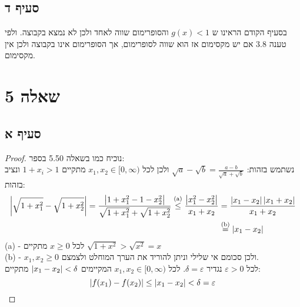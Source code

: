 \documentclass{article}
\begin{document}
	\subsection*{סעיף ד}
	בסעיף הקודם הראינו ש $g(x) < 1$ והסופרימום שווה לאחד ולכן לא נמצא בקבוצה. ולפי טענה 3.8 אם יש מקסימום אז הוא שווה לסופרימום, אך הסופרימום אינו בקבוצה ולכן אין מקסימום.


	\section*{שאלה 5}
	\subsection*{סעיף א}
	\begin{proof}
		נוכיח כמו בשאלה 5.50 בספר: \\
		נשתמש בזהות: $\sqrt{a} - \sqrt{b} = \frac{a-b}{\sqrt{a} + \sqrt{b}}$
		ולכן לכל $x_1, x_2 \in [0, \infty)$ מתקיים $1 + x_i > 1$ ונציב בזהות:
		\begin{align*}
			\left| \sqrt{1+x_1^2} - \sqrt{1 + x_2^2} \right| =
			\frac{\left| 1 + x_1^2 - 1 - x_2^2 \right|}{\sqrt{1 + x_1^2} + \sqrt{1 + x_2^2}} \overset{\text{(a)}}\leq
			\frac{\left| x_1^2 - x_2^2 \right|}{x_1 + x_2} &=
			\frac{\left| x_1 - x_2 \right|\left| x_1 + x_2 \right|}{x_1 + x_2} \\ &\overset{\text{(b)}}=
			\left| x_1 - x_2 \right|
		\end{align*}
		(a) - לכל $x \geq 0$ מתקיים $\sqrt{1 + x^2} > \sqrt{x^2} = x$ \\
		(b) - $x_1, x_2 \geq 0$ ולכן סכומם אי שלילי וניתן להוריד את הערך המוחלט ולצמצם. \\
		לכל $\varepsilon > 0$ נגדיר $\delta = \varepsilon$. לכל $x_1,x_2 \in [0, \infty)$ המקיימים $\left| x_1 - x_2 \right| < \delta$ מתקיים:
		\[
		\left| f(x_1) - f(x_2) \right| \leq 	\left| x_1 - x_2 \right| < \delta = \varepsilon
		\]
	\end{proof}
\end{document}
